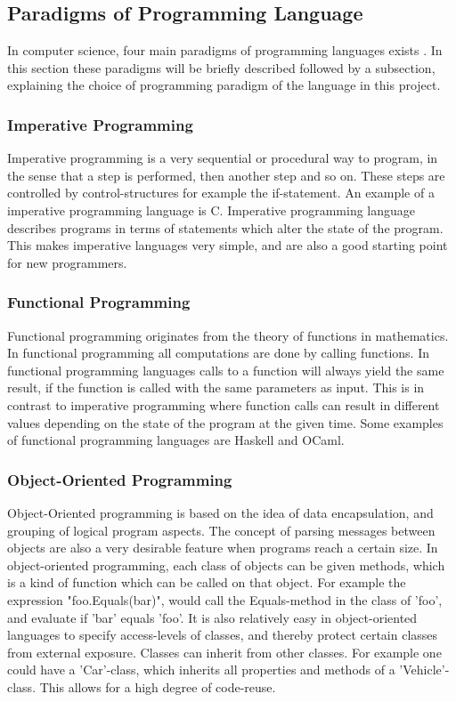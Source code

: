 \subsection{Paradigms of Programming Language}
In computer science, four main paradigms of programming languages exists \citep{ProgrammingParadigms}. In this section these paradigms will be briefly described followed by a subsection, explaining the choice of programming paradigm of the language in this project.

\subsubsection{Imperative Programming}
Imperative programming is a very sequential or procedural way to program, in the sense that a step is performed, then another step and so on. These steps are controlled by control-structures for example the if-statement. An example of a imperative programming language is C. Imperative programming language describes programs in terms of statements which alter the state of the program. This makes imperative languages very simple, and are also a good starting point for new programmers.

\subsubsection{Functional Programming}
Functional programming originates from the theory of functions in mathematics. In functional programming all computations are done by calling functions. In functional programming languages calls to a function will always yield the same result, if the function is called with the same parameters as input. This is in contrast to imperative programming where function calls can result in different values depending on the state of the program at the given time. Some examples of functional programming languages are Haskell and OCaml.

\subsubsection{Object-Oriented Programming}
Object-Oriented programming is based on the idea of data encapsulation, and grouping of logical program aspects. The concept of parsing messages between objects are also a very desirable feature when programs reach a certain size. In object-oriented programming, each class of objects can be given methods, which is a kind of function which can be called on that object. For example the expression "foo.Equals(bar)", would call the Equals-method in the class of 'foo', and evaluate if 'bar' equals 'foo'. It is also relatively easy in object-oriented languages to specify access-levels of classes, and thereby protect certain classes from external exposure. Classes can inherit from other classes. For example one could have a 'Car'-class, which inherits all properties and methods of a 'Vehicle'-class. This allows for a high degree of code-reuse.

